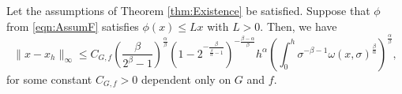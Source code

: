 \documentclass[10pt,a4paper]{amsart}
\begin{document}
\begin{thm}\label{thm:LinearCollocationConvergence}
	Let the assumptions of Theorem \ref{thm:Existence} be satisfied. Suppose that $\phi$ from \eqref{eqn:AssumF} satisfies $\phi(x) \leq L x$ with $L>0$. Then, we have
	\begin{equation}\label{eqn:LinearCollocationError}
		\|x - x_h\|_\infty \leq C_{G,f} \left(\frac{\beta}{2^{\beta}-1}\right)^\frac{\alpha}{\beta} \left(1-2^{-\frac{\beta}{\frac{\beta}{\alpha}-1}}\right)^{-\frac{\beta - \alpha}{\beta}}h^\alpha \left(\int_0^h \sigma^{-\beta-1} \omega(x,\sigma)^\frac{\beta}{\alpha}\right)^\frac{\alpha}{\beta},
	\end{equation}
	for some constant $C_{G,f}>0$ dependent only on $G$ and $f$. 
\end{thm}
\end{document}

